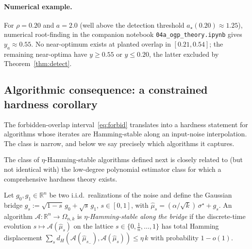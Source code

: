 \paragraph{Numerical example.} For $\rho=0.20$ and $a = 2.0$ (well above the detection
threshold $a_\star(0.20)\approx 1.25$), numerical root-finding in the companion notebook
\texttt{04a\_ogp\_theory.ipynb} gives $y_a\approx 0.55$. No near-optimum exists at
planted overlap in $[0.21, 0.54]$; the remaining near-optima have $y\geq 0.55$ or
$y\leq 0.20$, the latter excluded by Theorem~\ref{thm:detect}.

\subsection{Algorithmic consequence: a constrained hardness corollary}\label{ssec:cor-scope}

The forbidden-overlap interval~\eqref{eq:forbid} translates into a hardness statement
for algorithms whose iterates are Hamming-stable along an input-noise interpolation.
The class is narrow, and below we say precisely which algorithms it captures.

The class of $\eta$-Hamming-stable algorithms defined next is closely related to (but
not identical with) the low-degree polynomial estimator class for which a comprehensive
hardness theory exists.

\begin{definition}\label{def:stable}
Let $g_0,g_1\in\mathbb R^n$ be two i.i.d.\ realizations of the noise and define the
Gaussian bridge $g_s := \sqrt{1-s}\,g_0 + \sqrt{s}\,g_1$, $s\in[0,1]$, with
$\hat\mu_s = (\alpha/\sqrt k)\,\sigma^\star + g_s$. An algorithm
$\mathcal A:\mathbb R^n\to\Omega_{n,k}$ is \emph{$\eta$-Hamming-stable along the bridge}
if the discrete-time evolution $s\mapsto\mathcal A(\hat\mu_s)$ on the lattice
$s\in\{0,\tfrac1n,\dots,1\}$ has total Hamming displacement
$\sum_{s} d_H(\mathcal A(\hat\mu_{s_-}),\mathcal A(\hat\mu_s)) \le \eta\,k$
with probability $1-o(1)$.
\end{definition}

